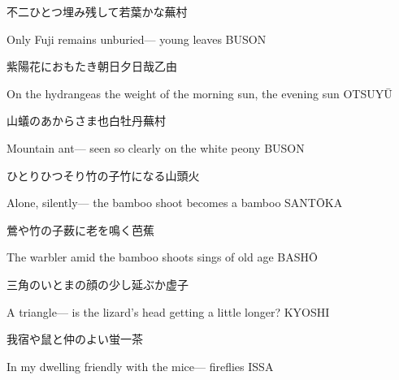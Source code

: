 \begin{haiku}
    {\FH 不二ひとつ埋み残して若葉かな}\hfill{\FH 蕪村}

    \vin{} Only Fuji
    \vin{} \vin{} remains unburied---
    \vin{} \vin{} \vin{} young leaves \hspace{\fill} BUSON
\end{haiku}

\begin{haiku}
    {\FH 紫陽花におもたき朝日夕日哉}\hfill{\FH 乙由}

    \vin{} On the hydrangeas
    \vin{} \vin{} the weight of the morning sun,
    \vin{} \vin{} \vin{} the evening sun \hspace{\fill} OTSUY\={U}
\end{haiku}

\begin{haiku}
    {\FH 山蟻のあからさま也白牡丹}\hfill{\FH 蕪村}

    \vin{} Mountain ant---
    \vin{} \vin{} seen so clearly
    \vin{} \vin{} \vin{} on the white peony \hspace{\fill} BUSON
\end{haiku}

\begin{haiku}
    {\FH ひとりひつそり竹の子竹になる}\hfill{\FH 山頭火}

    \vin{} Alone, silently---
    \vin{} \vin{} the bamboo shoot
    \vin{} \vin{} \vin{} becomes a bamboo \hspace{\fill} SANT\={O}KA
\end{haiku}

\begin{haiku}
    {\FH 鶯や竹の子薮に老を鳴く}\hfill{\FH 芭蕉}

    \vin{} The warbler
    \vin{} \vin{} amid the bamboo shoots
    \vin{} \vin{} \vin{} sings of old age \hspace{\fill} BASH\={O}
\end{haiku}

\begin{haiku}
    {\FH 三角のいとまの顔の少し延ぶか}\hfill{\FH 虚子}

    \vin{} A triangle---
    \vin{} \vin{} is the lizard's head getting
    \vin{} \vin{} \vin{} a little longer? \hspace{\fill} KYOSHI
\end{haiku}

\begin{haiku}
    {\FH 我宿や鼠と仲のよい蛍}\hfill{\FH 一茶}

    \vin{} In my dwelling
    \vin{} \vin{} friendly with the mice---
    \vin{} \vin{} \vin{} fireflies \hspace{\fill} ISSA
\end{haiku}

